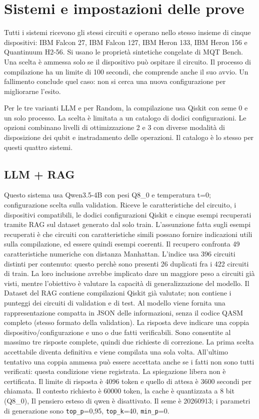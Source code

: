\clearpage
\section{Sistemi e impostazioni delle prove}
Tutti i sistemi ricevono gli stessi circuiti e operano nello stesso insieme
di cinque dispositivi: IBM Falcon 27, IBM Falcon 127, IBM Heron 133,
IBM Heron 156 e Quantinuum H2-56. Si usano le proprietà sintetiche congelate
di MQT Bench. Una scelta è ammessa solo se il dispositivo può ospitare
il circuito. Il processo di compilazione ha un limite di 100 secondi,
che comprende anche il suo avvio. Un fallimento conclude quel caso:
non si cerca una nuova configurazione per migliorarne l'esito.

Per le tre varianti LLM e per Random, la compilazione usa Qiskit con seme 0 e un solo
processo. La scelta è limitata a un catalogo di dodici configurazioni.
Le opzioni combinano livelli di ottimizzazione 2 e 3 con diverse modalità
di disposizione dei qubit e instradamento delle operazioni.
Il catalogo è lo stesso per questi quattro sistemi.

\subsection{LLM + RAG}
Questo sistema usa Qwen3.5-4B con pesi Q8\_0 e temperatura t=0; configurazione scelta sulla validation. Riceve le caratteristiche del circuito, i dispositivi compatibili, le dodici configurazioni Qiskit
e cinque esempi recuperati tramite RAG sul dataset generato dal solo train. L’assunzione fatta sugli esempi recuperati è che circuiti con caratteristiche simili possano fornire indicazioni utili sulla
compilazione, ed essere quindi esempi coerenti.
Il recupero confronta 49 caratteristiche numeriche con distanza Manhattan. L’indice usa 396
circuiti distinti per contenuto: questo perchè sono presenti 26 duplicati fra i 422 circuiti di train.
La loro inclusione avrebbe implicato dare un maggiore peso a circuiti già visti, mentre l’obiettivo è
valutare la capacità di generalizzazione del modello. Il Dataset del RAG contiene compilazioni Qiskit
già valutate; non contiene i punteggi dei circuiti di validation e di test. Al modello viene fornita
una rappresentazione compatta in JSON delle informazioni, senza il codice QASM completo (stesso
formato della validation).
La risposta deve indicare una coppia dispositivo/configurazione e uno o due fatti verificabili. Sono
consentite al massimo tre risposte complete, quindi due richieste di correzione. La prima scelta accettabile diventa definitiva e viene compilata una sola volta. All’ultimo tentativo una coppia ammessa
può essere accettata anche se i fatti non sono tutti verificati: questa condizione viene registrata. La
spiegazione libera non è certificata.
Il limite di risposta è 4096 token e quello di attesa è 3600 secondi per chiamata. Il contesto richiesto
è 60000 token, la cache è quantizzata a 8 bit (Q8\_0), Il pensiero esteso di qwen è disattivato. Il seme
è 20260913; i parametri di generazione sono \texttt{top\_p}=0,95, \texttt{top\_k}=40, \texttt{min\_p}=0.


